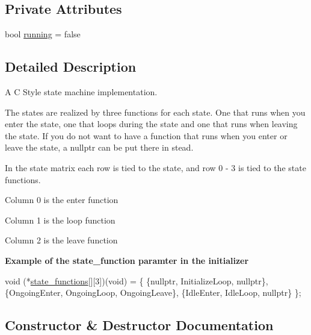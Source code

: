 \subsection*{Private Attributes}
\begin{DoxyCompactItemize}
\item 
bool \hyperlink{class_state_machine_adc6939485a12a6250df3cc65aa172d2a}{running} = false
\end{DoxyCompactItemize}


\subsection{Detailed Description}
A C Style state machine implementation. 

The states are realized by three functions for each state. One that runs when you enter the state, one that loops during the state and one that runs when leaving the state. If you do not want to have a function that runs when you enter or leave the state, a nullptr can be put there in stead.

In the state matrix each row is tied to the state, and row 0 -\/ 3 is tied to the state functions.


\begin{DoxyItemize}
\item Column 0 is the enter function  
\item Column 1 is the loop function  
\item Column 2 is the leave function  
\end{DoxyItemize}

{\bfseries Example of the state\+\_\+function paramter in the initializer} 
\begin{DoxyCode}
 void (*\hyperlink{class_state_machine_acc87359cd98c436f5b891ffe6cb67160}{state\_functions}[][3])(void) = \{
\{\textcolor{keyword}{nullptr}, InitializeLoop, \textcolor{keyword}{nullptr}\},
\{OngoingEnter, OngoingLoop, OngoingLeave\},
\{IdleEnter, IdleLoop,       \textcolor{keyword}{nullptr}\}
\};
\end{DoxyCode}
 

\subsection{Constructor \& Destructor Documentation}
\hypertarget{class_state_machine_ad9c6bdaca444710f77fc12d7e1af8fdc}{}\label{class_state_machine_ad9c6bdaca444710f77fc12d7e1af8fdc} 
